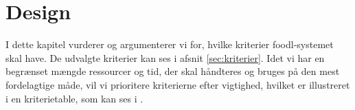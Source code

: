 \chapter{Design}
\label{chap:design}
I dette kapitel vurderer og argumenterer vi for, hvilke kriterier foodl-systemet skal have. De udvalgte kriterier kan ses i afsnit \ref{sec:kriterier}. Idet vi har en begrænset mængde ressourcer og tid, der skal håndteres og bruges på den mest fordelagtige måde, vil vi prioritere kriterierne efter vigtighed, hvilket er illustreret i en kriterietable, som kan ses i .


